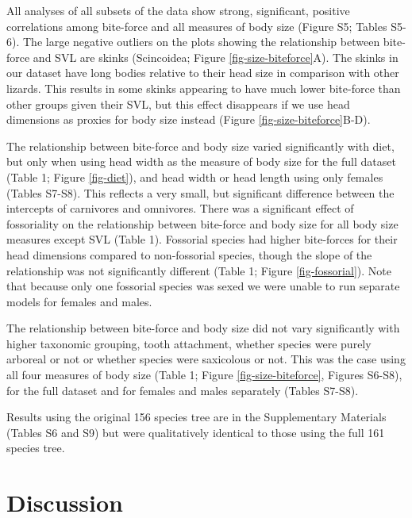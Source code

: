\documentclass[a4paper, 12pt]{article}
\begin{document}
All analyses of all subsets of the data show strong, significant, positive correlations among bite-force and all measures of body size (Figure S5; Tables S5-6). 
The large negative outliers on the plots showing the relationship between bite-force and SVL are skinks (Scincoidea; Figure \ref{fig-size-biteforce}A). 
The skinks in our dataset have long bodies relative to their head size in comparison with other lizards. 
This results in some skinks appearing to have much lower bite-force than other groups given their SVL, but this effect disappears if we use head dimensions as proxies for body size instead (Figure \ref{fig-size-biteforce}B-D).

The relationship between bite-force and body size varied significantly with diet, but only when using head width as the measure of body size for the full dataset (Table 1; Figure \ref{fig-diet}), and head width or head length using only females (Tables S7-S8). 
This reflects a very small, but significant difference between the intercepts of carnivores and omnivores. 
There was a significant effect of fossoriality on the relationship between bite-force and body size for all body size measures except SVL (Table 1). 
Fossorial species had higher bite-forces for their head dimensions compared to non-fossorial species, though the slope of the relationship was not significantly different (Table 1; Figure \ref{fig-fossorial}). 
Note that because only one fossorial species was sexed we were unable to run separate models for females and males. 

The relationship between bite-force and body size did not vary significantly with higher taxonomic grouping, tooth attachment, whether species were purely arboreal or not or whether species were saxicolous or not. 
This was the case using all four measures of body size (Table 1; Figure \ref{fig-size-biteforce}, Figures S6-S8), for the full dataset and for females and males separately (Tables S7-S8). 

Results using the original 156 species tree are in the Supplementary Materials (Tables S6 and S9) but were qualitatively identical to those using the full 161 species tree.



\section{Discussion}
\end{document}
